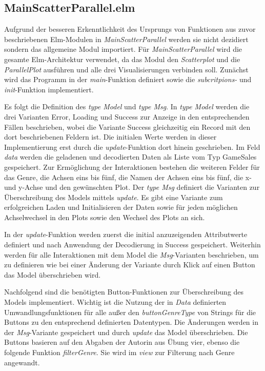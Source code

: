 \documentclass[usegeometry=true]{scrartcl}
\begin{document}
\subsection{MainScatterParallel.elm}
Aufgrund der besseren Erkenntlichkeit des Ursprungs von Funktionen aus zuvor beschriebenen Elm-Modulen in \textit{MainScatterParallel}
werden sie nicht dezidiert sondern das allgemeine Modul importiert. 
Für \textit{MainScatterParallel} wird die gesamte Elm-Architektur verwendet, da das Modul den \textit{Scatterplot} und die \textit{ParallelPlot} ausführen 
und alle drei Visualisierungen verbinden soll.
Zunächst wird das Programm in der \textit{main}-Funktion definiert sowie die \textit{subcritpions-} und \textit{init}-Funktion implementiert.

Es folgt die Definition des \textit{type Model} und \textit{type Msg}. 
In \textit{type Model} werden die drei Varianten Error, Loading und Success zur Anzeige in den entsprechenden Fällen beschrieben, 
wobei die Variante Success gleichzeitig ein Record mit den dort beschriebenen Feldern ist. 
Die initialen Werte werden in dieser Implementierung erst durch die \textit{update}-Funktion dort hinein geschrieben.
Im Feld \textit{data} werden die geladenen und decodierten Daten als Liste vom Typ GameSales gespeichert. 
Zur Ermöglichung der Interaktionen bestehen die weiteren Felder für das Genre, die Achsen eins bis fünf, 
die Namen der Achsen eins bis fünf, die x- und y-Achse und den gewünschten Plot. 
Der \textit{type Msg} definiert die Varianten zur Überschreibung des Models mittels \textit{update}. 
Es gibt eine Variante zum erfolgreichen Laden und Initialisieren der Daten sowie für jeden möglichen Achselwechsel in den Plots sowie den Wechsel des Plots an sich.

In der \textit{update}-Funktion werden zuerst die initial anzuzeigenden Attributwerte definiert und nach Anwendung der Decodierung in Success gespeichert. 
Weiterhin werden für alle Interaktionen mit dem Model die \textit{Msg}-Varianten beschrieben, 
um zu definieren wie bei einer Änderung der Variante durch Klick auf einen Button das Model überschrieben wird.

Nachfolgend sind die benötigten Button-Funktionen zur Überschreibung des Models implementiert.
Wichtig ist die Nutzung der in \textit{Data} definierten Umwandlungsfunktionen für alle außer den \textit{buttonGenreType} 
von Strings für die Buttons zu den entsprechend definierten Datentypen. 
Die Änderungen werden in der \textit{Msg}-Variante gespeichert und durch \textit{update} das Model überschrieben.
Die Buttons basieren auf den Abgaben der Autorin aus Übung vier, ebenso die folgende Funktion \textit{filterGenre}. 
Sie wird im \textit{view} zur Filterung nach Genre angewandt.
\end{document}
